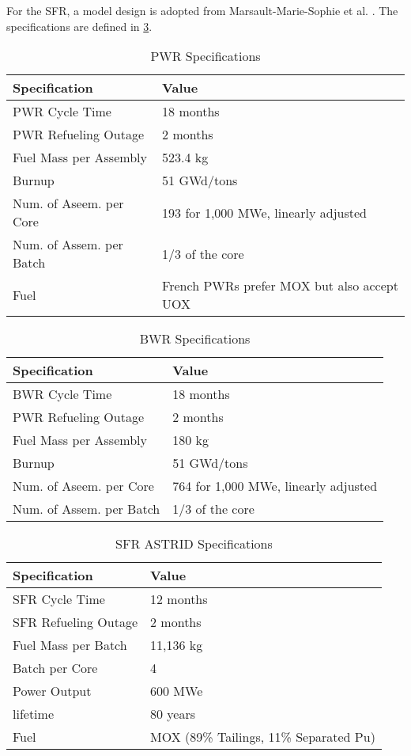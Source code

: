 For the \gls{SFR}, a model design is adopted from
Marsault-Marie-Sophie et al. \cite{varaine_pre-conceptual_2012}.
The specifications are defined in \cref{tab:sfr}.

\begin{table}[h]
	\centering
	\begin{tabularx}{\textwidth}{bb}
		\hline
		Specification & Value \\
		\hline
		PWR Cycle Time & 18 months \\ 
		PWR Refueling Outage & 2 months \\
		Fuel Mass per Assembly & 523.4 kg \\
		Burnup & 51 GWd/tons \\
		Num. of Aseem. per Core & 193 for 1,000 MWe, linearly adjusted\\
		Num. of Assem. per Batch & 1/3 of the core \\
		Fuel & \small{French \glspl{PWR} prefer \gls{MOX} but also accept \gls{UOX}}\\
		\hline
	\end{tabularx}
	\caption {\gls{PWR} Specifications}
	\label{tab:pwr}
	\end{table}
	
\begin{table}[h]
	\centering
	\begin{tabularx}{\textwidth}{bb}
		\hline
		Specification & Value \\
		\hline
		BWR Cycle Time & 18 months \\ 
		PWR Refueling Outage & 2 months \\
		Fuel Mass per Assembly & 180 kg \\
		Burnup & 51 GWd/tons \\
		Num. of Aseem. per Core & 764 for 1,000 MWe, linearly adjusted\\
		Num. of Assem. per Batch & 1/3 of the core \\
		\hline
	\end{tabularx}
	\caption {\gls{BWR} Specifications}
	\label{tab:bwr}
\end{table}
	
\begin{table}[h]
	\centering
	\begin{tabularx}{\textwidth}{bb}
		\hline
		Specification & Value \\
		\hline
		SFR Cycle Time & 12 months \\ 
		SFR Refueling Outage & 2 months \\
		Fuel Mass per Batch & 11,136 kg \\
		Batch per Core & 4 \\
		Power Output & 600 MWe \\
		lifetime & 80 years \\
		Fuel & {\small \gls{MOX} (89\% Tailings, 11\% Separated Pu)}\\
		\hline
	\end{tabularx}
	\caption {\gls{SFR} ASTRID Specifications \cite{varaine_pre-conceptual_2012}}
	\label{tab:sfr}
\end{table}
\FloatBarrier

